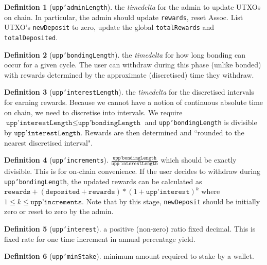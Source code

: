\documentclass[10pt, a4paper]{article}
\theoremstyle{definition}
\newtheorem{definition}{Definition}[section]
\begin{document}
\begin{definition}[\texttt{upp'adminLength}]\label{def:upp'adminLength}
the \textit{timedelta} for the admin to update UTXOs on chain. In particular, the admin should update \texttt{rewards}, reset Assoc. List UTXO's \texttt{newDeposit} to zero, update the global \texttt{totalRewards} and \texttt{totalDeposited}.
\end{definition}

\begin{definition}[\texttt{upp'bondingLength}]\label{def:upp'bondingLength}
the \textit{timedelta} for how long bonding can occur for a given cycle. The user can withdraw during this phase (unlike bonded) with rewards determined by the approximate (discretised) time they withdraw.
\end{definition}

\begin{definition}[\texttt{upp'interestLength}]\label{def:upp'interestLength}
the \textit{timedelta} for the discretised intervals for earning rewards. Because we cannot have a notion of continuous absolute time on chain, we need to discretise into intervals. We require  $\texttt{upp'interestLength} \leq \texttt{upp'bondingLength}$ and \texttt{upp'bondingLength} is divisible by $\texttt{upp'interestLength}$. Rewards are then determined and ``rounded to the nearest discretised interval".
\end{definition}


\begin{definition}[\texttt{upp'increments}]\label{def:upp'increments}
$\frac{\texttt{upp'bondingLength}} {\texttt{upp'interestLength}}$ which should be exactly divisible. This is for on-chain convenience. If the user decides to withdraw during \texttt{upp'bondingLength}, the updated rewards can be calculated as $\texttt{rewards} + (\texttt{deposited} + \texttt{rewards})* (1 + \texttt{upp'interest})^k$ where $1 \leq k \leq \texttt{upp'increments}.$ Note that by this stage, \texttt{newDeposit} should be initially zero or reset to zero by the admin.
\end{definition}

\begin{definition}[\texttt{upp'interest}]\label{def:upp'interest}
a positive (non-zero) ratio fixed decimal. This is fixed rate for one time increment in annual percentage yield.
\end{definition}

\begin{definition}[\texttt{upp'minStake}]\label{def:upp'minStake}
minimum amount required to stake by a wallet.
\end{definition}
\end{document}

